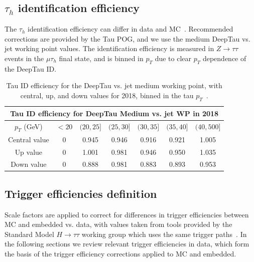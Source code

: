 \subsection{\texorpdfstring{$\tau_{h}$}{tauh} identification efficiency}
\label{sec:tauh_id_efficiency}

The $\tau_{h}$ identification efficiency can differ in data and MC~\cite{twiki_TAU_POG_tauidrecommendationforrun2}. Recommended corrections are provided by the Tau POG, and we use the medium DeepTau vs. jet working point values. The identification efficiency is measured in $Z \rightarrow \tau\tau$ events in the $\mu\tau_{h}$ final state, and is binned in $p_{T}$ due to clear $p_{T}$ dependence of the DeepTau ID. 


\begin{table}[ht]
    \centering
    \begin{tabular}{|c|c|c|c|c|c|c|}
    \hline
    \multicolumn{7}{|c|}{Tau ID efficiency for DeepTau Medium vs. jet WP in 2018}                                   \\ \hline
    \hline
    $p_{T}$ (GeV)  & $<20$  & $(20, 25]$ & $(25, 30]$ & $(30, 35]$ & $(35, 40]$ & $(40, 500] $   \\ \hline
    Central value  & 0      & 0.945      & 0.946      & 0.916      & 0.921      & 1.005 \\
    Up value       & 0      & 1.001      & 0.981      & 0.946      & 0.950      & 1.035 \\
    Down value     & 0      & 0.888      & 0.981      & 0.883      & 0.893      & 0.953 \\ \hline
    \end{tabular}
    \caption[Tau ID efficiency for the DeepTau vs. jet medium working point, with central, up, and down values for 2018, binned in the tau $p_{T}$.]{Tau ID efficiency for the DeepTau vs. jet medium working point, with central, up, and down values for 2018, binned in the tau $p_{T}$~\cite{twiki_TAU_POG_tauidrecommendationforrun2}.}
    \label{table:tauIDeff_deepTau_vs_jet_medium_WP}
\end{table}


\subsection{Trigger efficiencies definition}

Scale factors are applied to correct for differences in trigger efficiencies between MC and embedded vs. data, with values taken from tools provided by the Standard Model $H \rightarrow \tau\tau$ working group which uses the same trigger paths~\cite{twiki_HiggsToTauTauWorkingLegacyRun2}. In the following sections we review relevant trigger efficiencies in data, which form the basis of the trigger efficiency corrections applied to MC and embedded.

